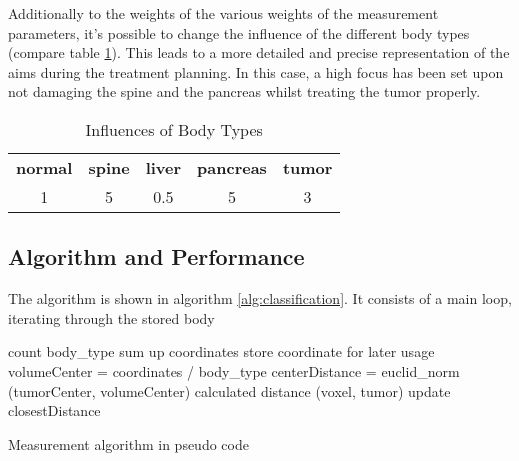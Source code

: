 Additionally to the weights of the various weights of the measurement parameters, it's possible to change the influence of the different body types (compare table \ref{tbl:classification_type_weights}). This leads to a more detailed and precise representation of the aims during the treatment planning. In this case, a high focus has been set upon not damaging the spine and the pancreas whilst treating the tumor properly. 

\begin{table}
\centering
\caption{Influences of Body Types}
\begin{tabular}[htbp]{c | c | c | c | c}
\textbf{normal} & \textbf{spine} & \textbf{liver} & \textbf{pancreas} & \textbf{tumor} \\
1 & 5 & 0.5 & 5 & 3
\end{tabular}
\label{tbl:classification_type_weights}
\end{table}

\subsection{Algorithm and Performance}\label{classification:algorithm}
The algorithm is shown in algorithm \ref{alg:classification}. It consists of a main loop, iterating through the stored body

\begin{algorithm}[H]
\label{alg:classification}
	count body_type \;
	sum up coordinates \;
		store coordinate for later usage \;
	\EndIf
\EndFor
volumeCenter = coordinates / body_type \;
centerDistance = euclid_norm (tumorCenter, volumeCenter) \;
		calculated distance (voxel, tumor) \;
			update closestDistance \;
		\EndIf
	\EndFor
\EndFor
\caption{Measurement algorithm in pseudo code}
\end{algorithm}